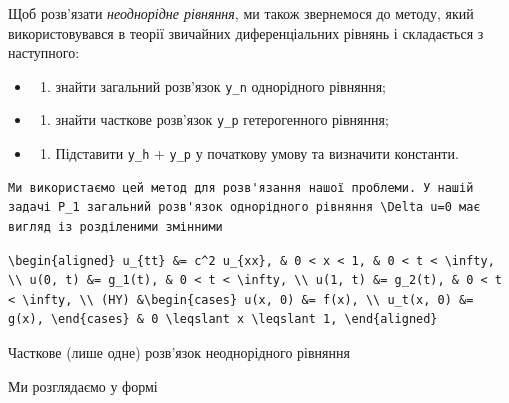 \documentclass[
  ukrainian,
]{article}
\providecommand{\tightlist}{%
  \setlength{\itemsep}{0pt}\setlength{\parskip}{0pt}}
\begin{document}
Щоб розв'язати \emph{неоднорідне рівняння}, ми також звернемося до
методу, який використовувався в теорії звичайних диференціальних рівнянь
і складається з наступного:

\begin{itemize}
\tightlist
\item
  \begin{enumerate}
  \def\labelenumi{\arabic{enumi})}
  \tightlist
  \item
    знайти загальний розв'язок \texttt{y\_n} однорідного рівняння;
  \end{enumerate}
\item
  \begin{enumerate}
  \def\labelenumi{\arabic{enumi})}
  \setcounter{enumi}{1}
  \tightlist
  \item
    знайти часткове розв'язок \texttt{y\_p} гетерогенного рівняння;
  \end{enumerate}
\item
  \begin{enumerate}
  \def\labelenumi{\arabic{enumi})}
  \setcounter{enumi}{2}
  \tightlist
  \item
    Підставити \texttt{y\_h} + \texttt{y\_p} у початкову умову та
    визначити константи.
  \end{enumerate}
\end{itemize}

\begin{verbatim}
Ми використаємо цей метод для розв'язання нашої проблеми. У нашій задачі P_1 загальний розв'язок однорідного рівняння \Delta u=0 має вигляд із розділеними змінними
\end{verbatim}

\begin{verbatim}
\begin{aligned} u_{tt} &= c^2 u_{xx}, & 0 < x < 1, & 0 < t < \infty, \\ u(0, t) &= g_1(t), & 0 < t < \infty, \\ u(1, t) &= g_2(t), & 0 < t < \infty, \\ (HY) &\begin{cases} u(x, 0) &= f(x), \\ u_t(x, 0) &= g(x), \end{cases} & 0 \leqslant x \leqslant 1, \end{aligned}
\end{verbatim}

Часткове (лише одне) розв'язок неоднорідного рівняння

Ми розглядаємо у формі
\end{document}
